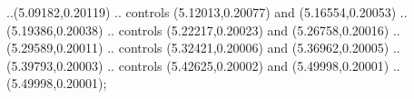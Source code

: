 ..(5.09182,0.20119) .. controls (5.12013,0.20077) and (5.16554,0.20053) ..(5.19386,0.20038) .. controls (5.22217,0.20023) and (5.26758,0.20016) ..(5.29589,0.20011) .. controls (5.32421,0.20006) and (5.36962,0.20005) ..(5.39793,0.20003) .. controls (5.42625,0.20002) and (5.49998,0.20001) ..(5.49998,0.20001);
